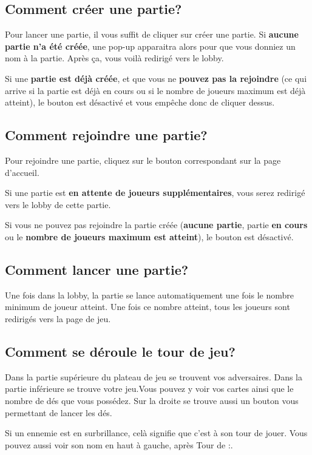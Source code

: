 \documentclass[11pt]{scrreprt}
\begin{document}
    \subsection{Comment créer une partie?}
    Pour lancer une partie, il vous suffit de cliquer sur créer une partie.
    Si \textbf{aucune partie n'a été créée}, une pop-up apparaitra alors pour que vous donniez un nom à la partie. Après ça, vous voilà redirigé vers le lobby.

    Si une \textbf{partie est déjà créée}, et que vous ne \textbf{pouvez pas la rejoindre} (ce qui arrive si la partie est déjà en cours ou si le nombre de joueurs maximum est déjà atteint), le bouton est désactivé et vous empêche donc de cliquer dessus.

    \subsection{Comment rejoindre une partie?}
    Pour rejoindre une partie, cliquez sur le bouton correspondant sur la page d'accueil.

    Si une partie est \textbf{en attente de joueurs supplémentaires}, vous serez redirigé vers le lobby de cette partie.

    Si vous ne pouvez pas rejoindre la partie créée (\textbf{aucune partie}, partie \textbf{en cours} ou le \textbf{nombre de joueurs maximum est atteint}), le bouton est désactivé.

    \subsection{Comment lancer une partie?}
    Une fois dans la lobby, la partie se lance automatiquement une fois le nombre minimum de joueur atteint. Une fois ce nombre atteint, tous les joueurs sont redirigés vers la page de jeu.

    \subsection{Comment se déroule le tour de jeu?}
    Dans la partie supérieure du plateau de jeu se trouvent vos adversaires. Dans la partie inférieure se trouve votre jeu.Vous pouvez y voir vos cartes ainsi que le nombre de dés que vous possédez. Sur la droite se trouve aussi un bouton vous permettant de lancer les dés.

    Si un ennemie est en surbrillance, celà signifie que c'est à son tour de jouer. Vous pouvez aussi voir son nom en haut à gauche, après \og Tour de :\fg{}.
\end{document}
